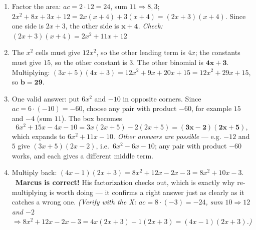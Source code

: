 \documentclass[11pt]{article}
\begin{document}
\begin{anskey}[title={Part 4 --- Reasoning \& Applications}]
\begin{enumerate}[label=\textbf{\arabic*.},leftmargin=2em,itemsep=6pt]
\item Factor the area: $ac = 2\cdot12 = 24$, sum $11 \Rightarrow 8,3$;
\ $2x^2+8x+3x+12 = 2x(x+4)+3(x+4) = (2x+3)(x+4)$.
Since one side is $2x+3$, the other side is $\mathbf{x+4}$.
\emph{Check:} $(2x+3)(x+4) = 2x^2+11x+12$ 

\item The $x^2$ cells must give $12x^2$, so the other leading term is $4x$;
the constants must give $15$, so the other constant is $3$.
The other binomial is $\mathbf{4x+3}$.
Multiplying: $(3x+5)(4x+3) = 12x^2+9x+20x+15 = 12x^2+29x+15$, so $\mathbf{b = 29}$.

\item One valid answer: put $6x^2$ and $-10$ in opposite corners.
Since $ac = 6\cdot(-10) = -60$, choose any pair with product $-60$, for example $15$ and $-4$
(sum $11$). The box becomes
\[
6x^2 + 15x - 4x - 10 = 3x(2x+5) - 2(2x+5) = \mathbf{(3x-2)(2x+5)},
\]
which expands to $6x^2 + 11x - 10$.
\emph{Other answers are possible} --- e.g. $-12$ and $5$ give $(3x+5)(2x-2)$, i.e.\
$6x^2-6x-10$; any pair with product $-60$ works, and each gives a different middle term.

\item Multiply back: $(4x-1)(2x+3) = 8x^2 + 12x - 2x - 3 = 8x^2 + 10x - 3$.
\ \textbf{Marcus is correct!} \ding{51}
His factorization checks out, which is exactly why re-multiplying is worth doing ---
it confirms a right answer just as clearly as it catches a wrong one.
\emph{(Verify with the X: $ac = 8\cdot(-3) = -24$, sum $10 \Rightarrow 12$ and $-2$
\ $\Rightarrow 8x^2+12x-2x-3 = 4x(2x+3)-1(2x+3) = (4x-1)(2x+3)$.)}
\end{enumerate}
\end{anskey}
\end{document}
